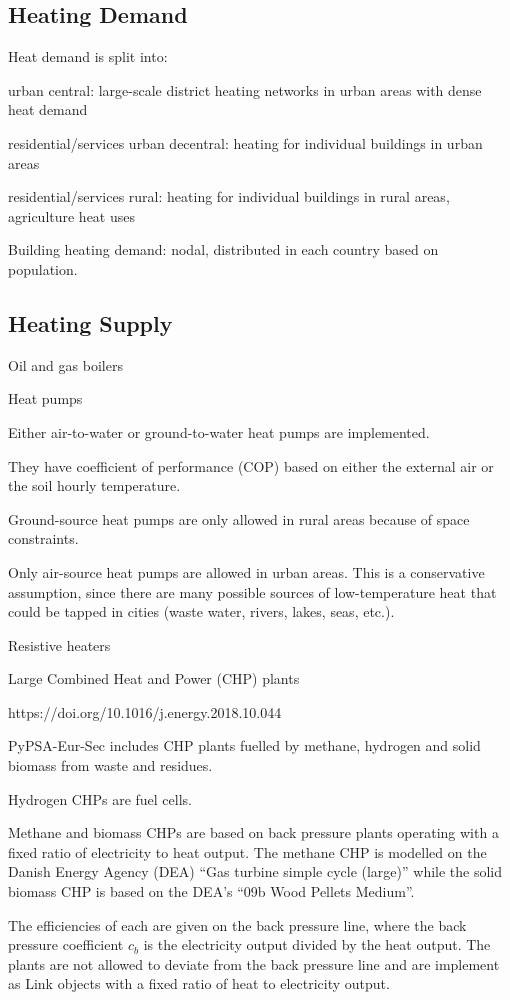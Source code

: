 \subsection{Heating Demand}

Heat demand is split into:

urban central: large-scale district heating networks in urban areas with dense
heat demand

residential/services urban decentral: heating for individual buildings in urban
areas

residential/services rural: heating for individual buildings in rural areas,
agriculture heat uses

Building heating demand: nodal, distributed in each country based on population.


\subsection{Heating Supply}

Oil and gas boilers

Heat pumps

Either air-to-water or ground-to-water heat pumps are implemented.

They have coefficient of performance (COP) based on either the external air or the soil hourly temperature.

Ground-source heat pumps are only allowed in rural areas because of space constraints.

Only air-source heat pumps are allowed in urban areas. This is a conservative
assumption, since there are many possible sources of low-temperature heat that
could be tapped in cities (waste water, rivers, lakes, seas, etc.).

Resistive heaters

Large Combined Heat and Power (CHP) plants

https://doi.org/10.1016/j.energy.2018.10.044

PyPSA-Eur-Sec includes CHP plants fuelled by methane, hydrogen and solid biomass from waste and residues.

Hydrogen CHPs are fuel cells.

Methane and biomass CHPs are based on back pressure plants operating with a
fixed ratio of electricity to heat output. The methane CHP is modelled on the
Danish Energy Agency (DEA) “Gas turbine simple cycle (large)” while the solid
biomass CHP is based on the DEA’s “09b Wood Pellets Medium”.

The efficiencies of each are given on the back pressure line, where the back
pressure coefficient $c_b$ is the electricity output divided by the heat output.
The plants are not allowed to deviate from the back pressure line and are
implement as Link objects with a fixed ratio of heat to electricity output.

